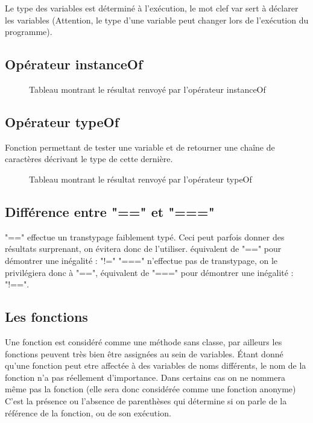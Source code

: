 \documentclass{article}[12pt]
\begin{document}
Le type des variables est déterminé à l'exécution, le mot clef {\color{blue} var} sert à déclarer les variables (Attention, le type d'une variable peut changer lors de l'exécution du programme).
\newpage
\subsection{Opérateur instanceOf}

\begin{figure}[H]
	\centering
    \caption{Tableau montrant le résultat renvoyé par l'opérateur instanceOf}
\end{figure}

\subsection{Opérateur typeOf}

Fonction permettant de tester une variable et de retourner une chaîne de caractères décrivant le type de cette dernière.

\begin{figure}[H]
	\centering
    \caption{Tableau montrant le résultat renvoyé par l'opérateur typeOf}
\end{figure}

\subsection{Différence entre "==" et "==="}

"==" effectue un transtypage faiblement typé. Ceci peut parfois donner des résultats surprenant, on évitera donc de l'utiliser. équivalent de "==" pour démontrer une inégalité : "!="
\newline
\newline
"===" n'effectue pas de transtypage, on le privilégiera donc à "==",  équivalent de "===" pour démontrer une inégalité : "!==".

\subsection{Les fonctions}

Une fonction est considéré comme une méthode sans classe, par ailleurs les fonctions peuvent très bien être assignées au sein de variables. 
\newline
\newline
Étant donné qu'une fonction peut etre affectée à des variables de noms différents, le nom de la fonction n'a pas réellement d'importance. Dans certains cas on ne nommera même pas la fonction (elle sera donc considérée comme une fonction anonyme)
\newline
\newline
C'est la présence ou l'absence de parenthèses qui détermine si on parle de la référence de la fonction, ou de son exécution.
\end{document}
